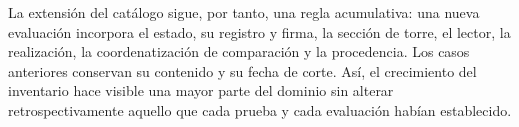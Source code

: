 La extensión del catálogo sigue, por tanto, una regla acumulativa:
una nueva evaluación incorpora el estado, su registro y firma, la sección
de torre, el lector, la realización, la coordenatización de comparación y la
procedencia. Los casos anteriores conservan su contenido y su fecha de
corte. Así, el crecimiento del inventario hace visible una mayor parte
del dominio sin alterar retrospectivamente aquello que cada prueba y
cada evaluación habían establecido.
